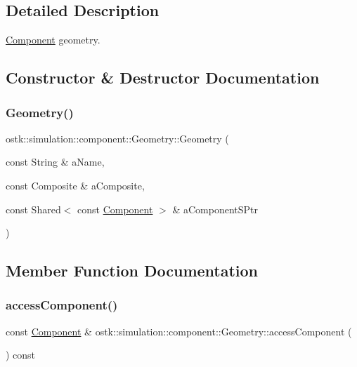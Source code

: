 \subsection{Detailed Description}
\hyperlink{classostk_1_1simulation_1_1_component}{Component} geometry. 

\subsection{Constructor \& Destructor Documentation}
\mbox{\label{classostk_1_1simulation_1_1component_1_1_geometry_a8a5e6c898e651ac1e113d6e916f0583e}} 
\subsubsection{\texorpdfstring{Geometry()}{Geometry()}}
{\footnotesize\ttfamily ostk\+::simulation\+::component\+::\+Geometry\+::\+Geometry (\begin{DoxyParamCaption}\item[{const String \&}]{a\+Name,  }\item[{const Composite \&}]{a\+Composite,  }\item[{const Shared$<$ const \hyperlink{classostk_1_1simulation_1_1_component}{Component} $>$ \&}]{a\+Component\+S\+Ptr }\end{DoxyParamCaption})}



\subsection{Member Function Documentation}
\mbox{\label{classostk_1_1simulation_1_1component_1_1_geometry_aaf42fdfd3bccb180db7efe9db8eeaf4b}} 
\subsubsection{\texorpdfstring{access\+Component()}{accessComponent()}}
{\footnotesize\ttfamily const \hyperlink{classostk_1_1simulation_1_1_component}{Component} \& ostk\+::simulation\+::component\+::\+Geometry\+::access\+Component (\begin{DoxyParamCaption}{ }\end{DoxyParamCaption}) const}



